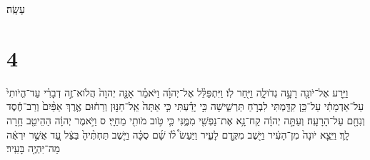 \documentclass{openreader}
\begin{document}
עָשָֽׂה׃ \section*{4}
וַיֵּ֥רַע אֶל־יֹונָ֖ה רָעָ֣ה גְדֹולָ֑ה וַיִּ֖חַר לֹֽו׃ וַיִּתְפַּלֵּ֨ל אֶל־יְהוָ֜ה וַיֹּאמַ֗ר אָנָּ֤ה יְהוָה֙ הֲלֹוא־זֶ֣ה דְבָרִ֗י עַד־הֱיֹותִי֙ עַל־אַדְמָתִ֔י עַל־כֵּ֥ן קִדַּ֖מְתִּי לִבְרֹ֣חַ תַּרְשִׁ֑ישָׁה כִּ֣י יָדַ֗עְתִּי כִּ֤י אַתָּה֙ אֵֽל־חַנּ֣וּן וְרַח֔וּם אֶ֤רֶךְ אַפַּ֨יִם֙ וְרַב־חֶ֔סֶד וְנִחָ֖ם עַל־הָרָעָֽה׃ וְעַתָּ֣ה יְהוָ֔ה קַח־נָ֥א אֶת־נַפְשִׁ֖י מִמֶּ֑נִּי כִּ֛י טֹ֥וב מֹותִ֖י מֵחַיָּֽי׃ ס וַיֹּ֣אמֶר יְהוָ֔ה הַהֵיטֵ֖ב חָ֥רָה לָֽךְ׃ וַיֵּצֵ֤א יֹונָה֙ מִן־הָעִ֔יר וַיֵּ֖שֶׁב מִקֶּ֣דֶם לָעִ֑יר וַיַּעַשׂ֩ לֹ֨ו שָׁ֜ם סֻכָּ֗ה וַיֵּ֤שֶׁב תַּחְתֶּ֨יהָ֙ בַּצֵּ֔ל עַ֚ד אֲשֶׁ֣ר יִרְאֶ֔ה מַה־יִּהְיֶ֖ה בָּעִֽיר׃ 
\end{document}
